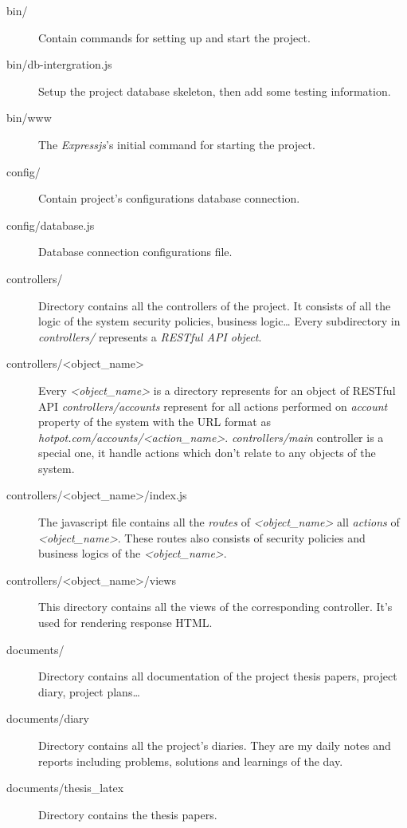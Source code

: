 \begin{description}

\item[bin/] Contain commands for setting up and start the project.
\item[bin/db-intergration.js] Setup the project database skeleton, then add some testing information.
\item[bin/www] The \emph{Expressjs}'s initial command for starting the project.

\item[config/] Contain project's configurations \eg database connection.
\item[config/database.js] Database connection configurations file.

\item[controllers/] Directory contains all the controllers of the project.
It consists of all the logic of the system \eg security policies, business logic\dots
Every subdirectory in \emph{controllers/} represents a \emph{RESTful API object}.
\item[controllers/<object\_name>] Every \emph{<object\_name>} is a directory represents for an object of RESTful API \eg \emph{controllers/accounts} represent for all actions performed on \emph{account} property of the system with the URL format as \emph{hotpot.com/accounts/<action\_name>}. 
\emph{controllers/main} controller is a special one, it handle actions which don't relate to any objects of the system.
\item[controllers/<object\_name>/index.js] The javascript file contains all the \emph{routes} of \emph{<object\_name>} \ie all \emph{actions} of \emph{<object\_name>}.
These routes also consists of security policies and business logics of the \emph{<object\_name>}.
\item[controllers/<object\_name>/views] This directory contains all the views of the corresponding controller.
It's used for rendering response HTML.

\item[documents/] 
Directory contains all documentation of the project \eg thesis papers, project diary, project plans\dots
\item[documents/diary] Directory contains all the project's diaries.
They are my daily notes and reports including problems, solutions and learnings of the day.
\item[documents/thesis\_latex] Directory contains the thesis papers.


\end{description}
